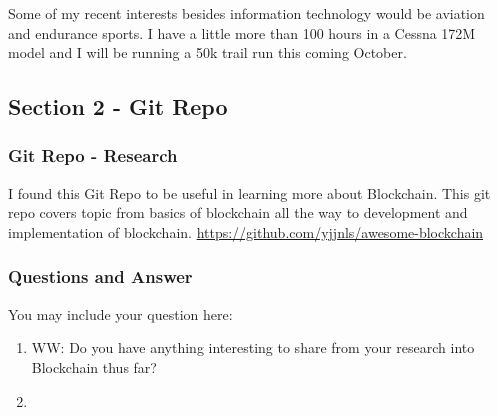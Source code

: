 Some of my recent interests besides information technology would be aviation and endurance sports. I have a little more than 100 hours in a Cessna 172M model and I will be running a 50k trail run this coming October.

\subsection{Section 2 - Git Repo}

\subsubsection{Git Repo - Research}
I found this Git Repo to be useful in learning more about Blockchain. This git repo covers topic from basics of blockchain all the way to development and implementation of blockchain.
\url{https://github.com/yjjnls/awesome-blockchain}


\subsubsection{Questions and Answer} 
You may include your question here:

\begin{enumerate}
    \item WW: Do you have anything interesting to share from your research into Blockchain thus far?
    \item
\end{enumerate}